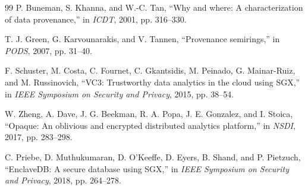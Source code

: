 \documentclass[conference]{IEEEtran}
\begin{document}
\begin{thebibliography}{99}
P. Buneman, S. Khanna, and W.-C. Tan, ``Why and where: A characterization of data provenance,'' in \emph{ICDT}, 2001, pp. 316--330.

T. J. Green, G. Karvounarakis, and V. Tannen, ``Provenance semirings,'' in \emph{PODS}, 2007, pp. 31--40.

F. Schuster, M. Costa, C. Fournet, C. Gkantsidis, M. Peinado, G. Mainar-Ruiz, and M. Russinovich, ``VC3: Trustworthy data analytics in the cloud using SGX,'' in \emph{IEEE Symposium on Security and Privacy}, 2015, pp. 38--54.

W. Zheng, A. Dave, J. G. Beekman, R. A. Popa, J. E. Gonzalez, and I. Stoica, ``Opaque: An oblivious and encrypted distributed analytics platform,'' in \emph{NSDI}, 2017, pp. 283--298.

C. Priebe, D. Muthukumaran, D. O'Keeffe, D. Eyers, B. Shand, and P. Pietzuch, ``EnclaveDB: A secure database using SGX,'' in \emph{IEEE Symposium on Security and Privacy}, 2018, pp. 264--278.

\end{thebibliography}
\end{document}
